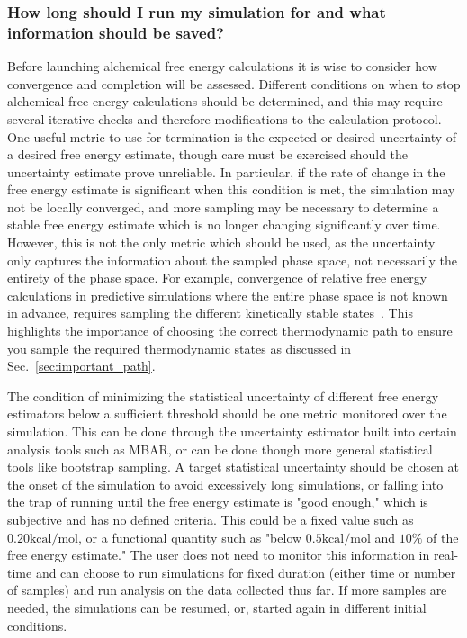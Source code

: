 \documentclass[9pt,bestpractices]{livecoms}
\begin{document}
\subsubsection{How long should I run my simulation for and what information should be saved?}
\label{sec:sim_length_information_kept}
Before launching alchemical free energy calculations it is wise to consider how convergence and completion will be assessed. Different conditions on when to stop alchemical free energy calculations should be determined, and this may require several iterative checks and therefore modifications to the calculation protocol.
One useful metric to use for termination is the expected or desired uncertainty of a desired free energy estimate, though care must be exercised should the uncertainty estimate prove unreliable.
In particular, if the rate of change in the free energy estimate is significant when this condition is met, the simulation may not be locally converged, and more sampling may be necessary to determine a stable free energy estimate which is no longer changing significantly over time. 
However, this is not the only metric which should be used, as the uncertainty only captures the information about the sampled phase space, not necessarily the entirety of the phase space.  
For example, convergence of relative free energy calculations in predictive simulations where the entire phase space is not known in advance, requires sampling the different kinetically stable states~\cite{mobley2012perspective}. 
This highlights the importance of choosing the correct thermodynamic path to ensure you sample the required thermodynamic states as discussed in Sec.~\ref{sec:important_path}.

The condition of minimizing the statistical uncertainty of different free energy estimators below a sufficient threshold should be one metric monitored over the simulation. This can be done through the uncertainty estimator built into certain analysis tools such as MBAR, or can be done though more general statistical tools like bootstrap sampling. 
A target statistical uncertainty should be chosen at the onset of the simulation to avoid excessively long simulations, or falling into the trap of running until the free energy estimate is "good enough," which is subjective and has no defined criteria. This could be a fixed value such as $0.20 \mathrm{kcal/mol}$, or a functional quantity such as "below $0.5 \mathrm{kcal/mol}$ and $10\%$ of the free energy estimate." The user does not need to monitor this information in real-time and can choose to run simulations for fixed duration (either time or number of samples) and run analysis on the data collected thus far. If more samples are needed, the simulations can be resumed, or, started again in different initial conditions. 
\end{document}
